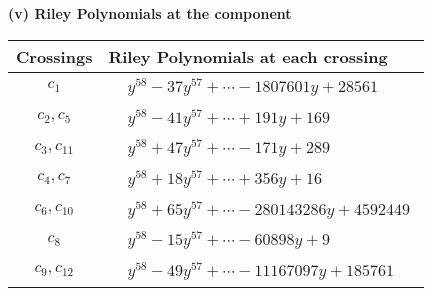 \documentclass[1p]{elsarticle_modified}
\theoremstyle{definition}
\begin{document}
\flushleft \textbf{(v) Riley Polynomials at the component}\newline \\
\begin{tabular}{m{50pt}|m{274pt}}
Crossings & \hspace{64pt}Riley Polynomials at each crossing \\
\hline $$\begin{aligned}c_{1}\end{aligned}$$&$\begin{aligned}
&y^{58}-37 y^{57}+\cdots-1807601 y+28561
\end{aligned}$\\
\hline $$\begin{aligned}c_{2},c_{5}\end{aligned}$$&$\begin{aligned}
&y^{58}-41 y^{57}+\cdots+191 y+169
\end{aligned}$\\
\hline $$\begin{aligned}c_{3},c_{11}\end{aligned}$$&$\begin{aligned}
&y^{58}+47 y^{57}+\cdots-171 y+289
\end{aligned}$\\
\hline $$\begin{aligned}c_{4},c_{7}\end{aligned}$$&$\begin{aligned}
&y^{58}+18 y^{57}+\cdots+356 y+16
\end{aligned}$\\
\hline $$\begin{aligned}c_{6},c_{10}\end{aligned}$$&$\begin{aligned}
&y^{58}+65 y^{57}+\cdots-280143286 y+4592449
\end{aligned}$\\
\hline $$\begin{aligned}c_{8}\end{aligned}$$&$\begin{aligned}
&y^{58}-15 y^{57}+\cdots-60898 y+9
\end{aligned}$\\
\hline $$\begin{aligned}c_{9},c_{12}\end{aligned}$$&$\begin{aligned}
&y^{58}-49 y^{57}+\cdots-11167097 y+185761
\end{aligned}$\\
\hline
\end{tabular}\\~\\
\end{document}
